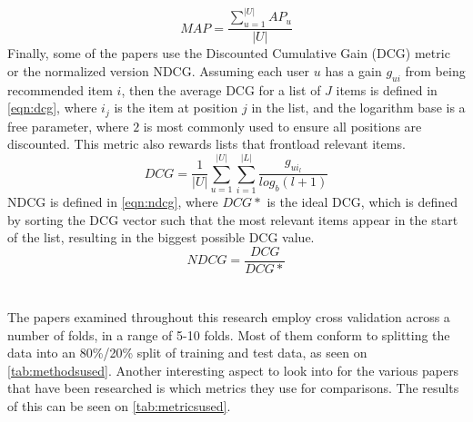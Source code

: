 \begin{equation}
    \label{eq:map}
    MAP = \frac{\sum\limits_{u=1}^|U| AP_u}{|U|}
\end{equation}
Finally, some of the papers use the Discounted Cumulative Gain (DCG) metric or the normalized version NDCG.
Assuming each user $u$ has a gain $g_{ui}$ from being recommended item $i$, then the average DCG for a list of $J$ items is defined in \autoref{eqn:dcg}, where $i_j$ is the item at position $j$ in the list, and the logarithm base is a free parameter, where $2$ is most commonly used to ensure all positions are discounted.
This metric also rewards lists that frontload relevant items.
\begin{equation}
    \label{eqn:dcg}
    DCG = \frac{1}{|U|} \sum\limits_{u=1}^|U| \sum\limits_{i = 1}^|L| \frac{g_{ui_l}}{log_b (l+1)}
\end{equation}
NDCG is defined in \autoref{eqn:ndcg}, where $DCG*$ is the ideal DCG, which is defined by sorting the DCG vector such that the most relevant items appear in the start of the list\cite{dcgpaper}, resulting in the biggest possible DCG value.
\begin{equation}
    \label{eqn:ndcg}
    NDCG = \frac{DCG}{DCG*}
\end{equation}
\\\\
The papers examined throughout this research employ cross validation across a number of folds, in a range of 5-10 folds.
Most of them conform to splitting the data into an 80\%/20\% split of training and test data, as seen on \autoref{tab:methodsused}.
Another interesting aspect to look into for the various papers that have been researched is which metrics they use for comparisons.
The results of this can be seen on \autoref{tab:metricsused}.

